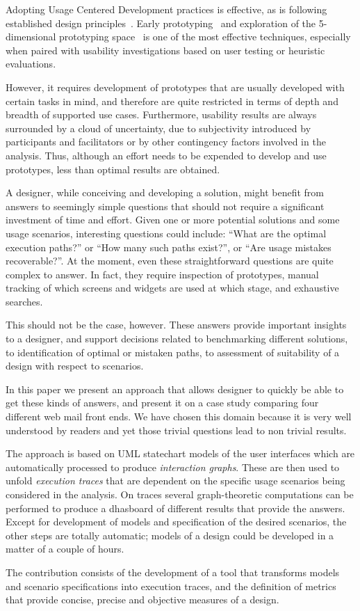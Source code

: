 \documentclass{sigchi}
\begin{document}
Adopting Usage Centered Development practices is effective, as is
following established design principles~\cite{constantine99}. Early
prototyping~\cite{buxton07} and exploration of the 5-dimensional prototyping
space~\cite{mccurdy06} is one of the most effective techniques,
especially when paired with usability investigations based on user
testing or heuristic evaluations.

However, it requires development of prototypes that are usually
developed with certain tasks in mind, and therefore are quite
restricted in terms of depth and breadth of supported use
cases. Furthermore, usability results are always surrounded by a cloud
of uncertainty, due to subjectivity introduced by participants and
facilitators or by other contingency factors involved in the
analysis. Thus, although an effort needs to be expended to develop and
use prototypes, less than optimal results are obtained.

A designer, while conceiving and developing a solution, might benefit
from answers to seemingly simple questions that should not require a
significant investment of time and effort. Given one or more potential
solutions and some usage scenarios, interesting questions could
include: ``What are the optimal execution paths?'' or ``How many such
paths exist?'', or ``Are usage mistakes recoverable?''. At the moment,
even these straightforward questions are quite complex to answer. In
fact, they require inspection of prototypes, manual tracking of which
screens and widgets are used at which stage, and exhaustive searches.

This should not be the case, however. These answers provide important
insights to a designer, and support decisions related to benchmarking
different solutions, to identification of optimal or mistaken paths,
to assessment of suitability of a design with respect to scenarios.

In this paper we present an approach that allows designer to quickly
be able to get these kinds of answers, and present it on a case study
comparing four different web mail front ends. We have chosen this
domain because it is very well understood by readers and yet those
trivial questions lead to non trivial results.

The approach is based on UML statechart models of the user interfaces
which are automatically processed to produce \emph{interaction
  graphs}. These are then used to unfold \emph{execution traces} that
are dependent on the specific usage scenarios being considered in the
analysis. On traces several graph-theoretic computations can be
performed to produce a dhasboard of different results that provide the
answers. Except for development of models and specification of the
desired scenarios, the other steps are totally automatic; models of a
design could be developed in a matter of a couple of hours.

The contribution consists of the development of a tool that transforms
models and scenario specifications into execution traces, and the
definition of metrics that provide concise, precise and objective
measures of a design.



\end{document}
